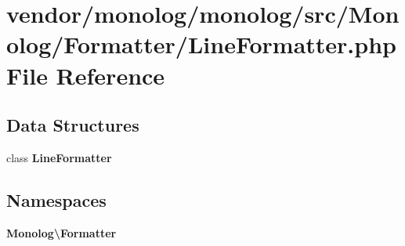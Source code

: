 \section{vendor/monolog/monolog/src/\+Monolog/\+Formatter/\+Line\+Formatter.php File Reference}
\label{_line_formatter_8php}
\subsection*{Data Structures}
\begin{DoxyCompactItemize}
\item 
class {\bf Line\+Formatter}
\end{DoxyCompactItemize}
\subsection*{Namespaces}
\begin{DoxyCompactItemize}
\item 
 {\bf Monolog\textbackslash{}\+Formatter}
\end{DoxyCompactItemize}
